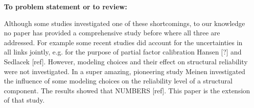 \begin{framed}
\textbf{To problem statement or to review:}

Although some studies investigated one of these shortcomings, to our knowledge no paper has provided a comprehensive study before where all three are addressed. For example some recent studies did account for the uncertainties in all links jointly, e.g. for the purpose of partial factor calibration Hansen [?] and Sedlacek [ref]. However, modeling choices and their effect on structural reliability were not investigated. In a super amazing, pioneering study Meinen investigated the influence of some modeling choices on the reliability level of a structural component. The results showed that NUMBERS [ref]. This paper is the extension of that study.
\end{framed}
